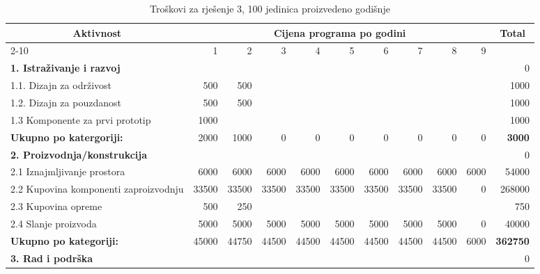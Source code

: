 \documentclass[12pt]{article}
\begin{document}
\begin{landscape}
\begin{table}[htbp]
  \centering
  \small
  \caption{Troškovi za rješenje 3, 100 jedinica proizvedeno godišnje}
    \begin{tabular}{lrrrrrrrrrr}
    \toprule
    \multicolumn{1}{c}{\multirow{2}[4]{*}{Aktivnost}} & \multicolumn{9}{c}{Cijena programa po godini}                         & \multicolumn{1}{c}{\multirow{2}[4]{*}{Total}} \\
\cmidrule{2-10}          & 1     & 2     & 3     & 4     & 5     & 6     & 7     & 8     & 9     &  \\
    \midrule
    \textbf{1. Istraživanje i razvoj} &       &       &       &       &       &       &       &       &       & 0 \\
    1.1. Dizajn za održivost & 500   & 500   &       &       &       &       &       &       &       & 1000 \\
    1.2. Dizajn za pouzdanost & 500   & 500   &       &       &       &       &       &       &       & 1000 \\
    1.3 Komponente za prvi prototip & 1000  &       &       &       &       &       &       &       &       & 1000 \\
    \midrule
    \textbf{Ukupno po katergoriji:} & 2000  & 1000  & 0     & 0     & 0     & 0     & 0     & 0     & 0     & \textbf{3000} \\
    \midrule
    \textbf{2. Proizvodnja/konstrukcija} &       &       &       &       &       &       &       &       &       & 0 \\
    2.1 Iznajmljivanje prostora & 6000  & 6000  & 6000  & 6000  & 6000  & 6000  & 6000  & 6000  & 6000  & 54000 \\
    \multicolumn{1}{p{14.715em}}{2.2 Kupovina komponenti za\newline{}proizvodnju} & 33500 & 33500 & 33500 & 33500 & 33500 & 33500 & 33500 & 33500 & 0     & 268000 \\
    2.3 Kupovina opreme & 500   & 250   &       &       &       &       &       &       &       & 750 \\
    2.4 Slanje proizvoda & 5000  & 5000  & 5000  & 5000  & 5000  & 5000  & 5000  & 5000  & 0     & 40000 \\
    \midrule
    \textbf{Ukupno po kategoriji:} & 45000 & 44750 & 44500 & 44500 & 44500 & 44500 & 44500 & 44500 & 6000  & \textbf{362750} \\
    \midrule
    \textbf{3. Rad i podrška} &       &       &       &       &       &       &       &       &       & 0 \\

\end{tabular}
\end{table}
\end{landscape}
\end{document}

